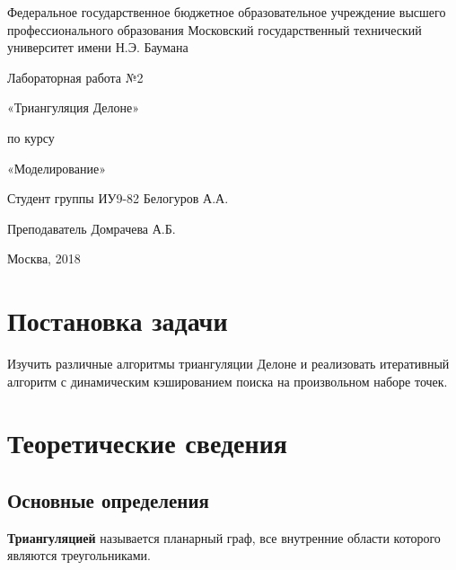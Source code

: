 \documentclass[a4paper, 12pt]{article}   	%
\begin{document}
\begin{titlepage}

\thispagestyle{empty}

\begin{center}
Федеральное государственное бюджетное образовательное учреждение высшего профессионального образования Московский государственный технический университет имени Н.Э. Баумана
\end{center}


\vfill

\centerline{\large{Лабораторная работа №2}}

\centerline{\large{«Триангуляция Делоне»}}

\centerline{\large{по курсу}}
\centerline{\large{«Моделирование»}}


\vfill

Студент группы ИУ9-82 \hfill Белогуров А.А.

Преподаватель \hfill Домрачева А.Б.
\vfill

\centerline{Москва, 2018}
\clearpage
\end{titlepage}

\newpage
\setcounter{page}{2}

\tableofcontents

\newpage

\section{Постановка задачи}
    Изучить различные алгоритмы триангуляции Делоне и реализовать итеративный алгоритм с динамическим кэшированием поиска на произвольном наборе точек.

\newpage

\section{Теоретические сведения}
\subsection{Основные определения}


    \textbf{Триангуляцией} называется планарный граф, все внутренние области которого являются треугольниками. \cite{scvortsov}
    
\end{document}
